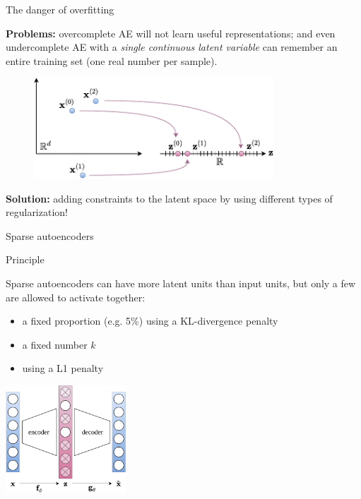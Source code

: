 \documentclass{beamer}
\begin{document}
  \begin{frame}{The danger of overfitting}
    
    \textbf{Problems:} overcomplete AE will not learn useful representations; and even undercomplete AE with a \emph{single continuous latent variable} can remember an entire training set (one real number per sample).

    \begin{figure}
      \includegraphics[width=0.8\textwidth]{rc/ae-real-numbers}
    \end{figure}
    
    \textbf{Solution:} adding \alert{constraints} to the latent space by using different types of \alert{regularization}! 

  \end{frame}

  \begin{frame}{Sparse autoencoders}


    \begin{block}{Principle}
      \small{
      Sparse autoencoders can have more latent units than input units, but \alert{only a few are allowed to activate together}:
      \vspace{-0.25cm}
      \begin{itemize}
        \item a fixed proportion (e.g. 5\%) using a KL-divergence penalty
        \item a fixed number $k$
        \item using a L1 penalty
      \end{itemize}
      }
    \end{block}
    
    \centering
    \includegraphics[width=4.5cm]{rc/sparse-autoencoder}
    
  \end{frame}
\end{document}
